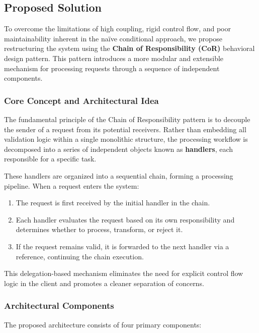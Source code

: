 \subsection{Proposed Solution}

To overcome the limitations of high coupling, rigid control flow, and poor maintainability inherent in the naïve conditional approach, we propose restructuring the system using the \textbf{Chain of Responsibility (CoR)} behavioral design pattern. This pattern introduces a more modular and extensible mechanism for processing requests through a sequence of independent components.

\subsubsection{Core Concept and Architectural Idea}
The fundamental principle of the Chain of Responsibility pattern is to decouple the sender of a request from its potential receivers. Rather than embedding all validation logic within a single monolithic structure, the processing workflow is decomposed into a series of independent objects known as \textbf{handlers}, each responsible for a specific task.

These handlers are organized into a sequential chain, forming a processing pipeline. When a request enters the system:

\begin{enumerate}
    \item The request is first received by the initial handler in the chain.
    \item Each handler evaluates the request based on its own responsibility and determines whether to process, transform, or reject it.
    \item If the request remains valid, it is forwarded to the next handler via a reference, continuing the chain execution.
\end{enumerate}

This delegation-based mechanism eliminates the need for explicit control flow logic in the client and promotes a cleaner separation of concerns.

\subsubsection{Architectural Components}
The proposed architecture consists of four primary components:

